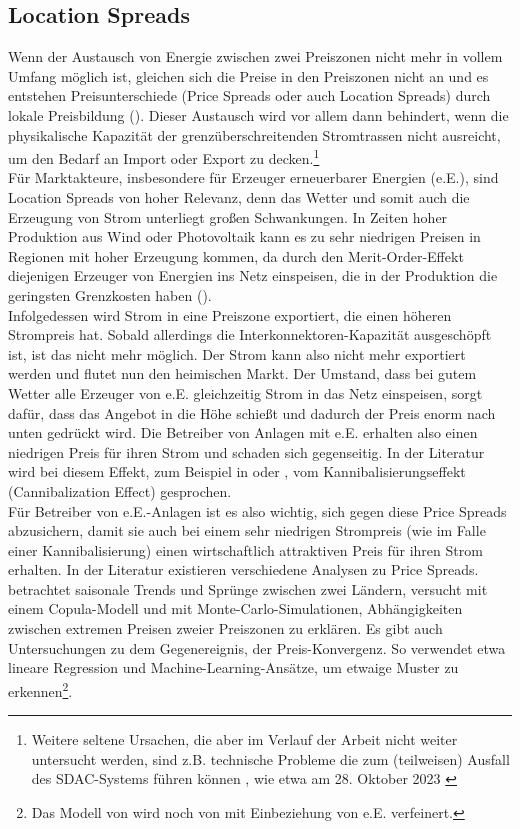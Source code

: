 \newpage
\subsection{Location Spreads}
\label{sec:Location Spreads}

Wenn der Austausch von Energie zwischen zwei Preiszonen nicht mehr in vollem Umfang möglich ist, gleichen sich die Preise in den Preiszonen nicht an und es entstehen Preisunterschiede (Price Spreads oder auch Location Spreads) durch lokale Preisbildung (\cite{3}). Dieser Austausch wird vor allem dann  behindert, wenn die physikalische Kapazität der grenzüberschreitenden Stromtrassen nicht ausreicht, um den Bedarf an Import oder Export zu decken.\footnote{Weitere seltene Ursachen, die aber im Verlauf der Arbeit nicht weiter untersucht werden, sind z.B. technische Probleme die zum (teilweisen) Ausfall des SDAC-Systems führen können , wie etwa am 28. Oktober 2023 \cite{ENTSOE_market_report}} \\
Für Marktakteure, insbesondere für Erzeuger erneuerbarer Energien (e.E.), sind Location Spreads von hoher Relevanz, denn das Wetter und somit auch die Erzeugung von Strom unterliegt großen Schwankungen. In Zeiten hoher Produktion aus Wind oder Photovoltaik kann es zu sehr niedrigen Preisen in Regionen mit hoher Erzeugung kommen, da durch den Merit-Order-Effekt diejenigen Erzeuger von Energien ins Netz einspeisen, die in der Produktion die geringsten Grenzkosten haben (\cite{7}).\\
Infolgedessen wird Strom in eine Preiszone exportiert, die einen höheren Strompreis hat. Sobald allerdings die Interkonnektoren-Kapazität ausgeschöpft ist, ist das nicht mehr möglich. Der Strom kann also nicht mehr exportiert werden und flutet nun den heimischen Markt. Der Umstand, dass bei gutem Wetter alle Erzeuger von e.E. gleichzeitig Strom in das Netz einspeisen, sorgt dafür, dass das Angebot in die Höhe schießt und dadurch der Preis enorm nach unten gedrückt wird. Die Betreiber von Anlagen mit e.E. erhalten also einen niedrigen Preis für ihren Strom und schaden sich gegenseitig. In der Literatur wird bei diesem Effekt, zum Beispiel in \cite{7} oder \cite{8}, vom Kannibalisierungseffekt (Cannibalization Effect) gesprochen. \\
Für Betreiber von e.E.-Anlagen ist es also wichtig, sich gegen diese Price Spreads abzusichern, damit sie auch bei einem sehr niedrigen Strompreis (wie im Falle einer Kannibalisierung) einen wirtschaftlich attraktiven Preis für ihren Strom erhalten. In der Literatur existieren verschiedene Analysen zu Price Spreads. \cite{10} betrachtet saisonale Trends und Sprünge zwischen zwei Ländern, \cite{12} versucht mit einem Copula-Modell und \cite{15} mit Monte-Carlo-Simulationen, Abhängigkeiten zwischen extremen Preisen zweier Preiszonen zu erklären. Es gibt auch Untersuchungen zu dem Gegenereignis, der Preis-Konvergenz. So verwendet \cite{13} etwa lineare Regression und \cite{16} Machine-Learning-Ansätze, um etwaige Muster zu erkennen\footnote{Das Modell von \cite{16} wird noch von \cite{20} mit Einbeziehung von e.E. verfeinert.}.




